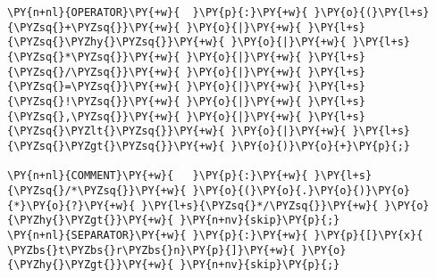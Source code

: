 \begin{Verbatim}[commandchars=\\\{\}]
\PY{n+nl}{OPERATOR}\PY{+w}{  }\PY{p}{:}\PY{+w}{ }\PY{o}{(}\PY{l+s}{\PYZsq{}+\PYZsq{}}\PY{+w}{ }\PY{o}{|}\PY{+w}{ }\PY{l+s}{\PYZsq{}\PYZhy{}\PYZsq{}}\PY{+w}{ }\PY{o}{|}\PY{+w}{ }\PY{l+s}{\PYZsq{}*\PYZsq{}}\PY{+w}{ }\PY{o}{|}\PY{+w}{ }\PY{l+s}{\PYZsq{}/\PYZsq{}}\PY{+w}{ }\PY{o}{|}\PY{+w}{ }\PY{l+s}{\PYZsq{}=\PYZsq{}}\PY{+w}{ }\PY{o}{|}\PY{+w}{ }\PY{l+s}{\PYZsq{}!\PYZsq{}}\PY{+w}{ }\PY{o}{|}\PY{+w}{ }\PY{l+s}{\PYZsq{},\PYZsq{}}\PY{+w}{ }\PY{o}{|}\PY{+w}{ }\PY{l+s}{\PYZsq{}\PYZlt{}\PYZsq{}}\PY{+w}{ }\PY{o}{|}\PY{+w}{ }\PY{l+s}{\PYZsq{}\PYZgt{}\PYZsq{}}\PY{+w}{ }\PY{o}{)}\PY{o}{+}\PY{p}{;}

\PY{n+nl}{COMMENT}\PY{+w}{   }\PY{p}{:}\PY{+w}{ }\PY{l+s}{\PYZsq{}/*\PYZsq{}}\PY{+w}{ }\PY{o}{(}\PY{o}{.}\PY{o}{)}\PY{o}{*}\PY{o}{?}\PY{+w}{ }\PY{l+s}{\PYZsq{}*/\PYZsq{}}\PY{+w}{ }\PY{o}{\PYZhy{}\PYZgt{}}\PY{+w}{ }\PY{n+nv}{skip}\PY{p}{;}
\PY{n+nl}{SEPARATOR}\PY{+w}{ }\PY{p}{:}\PY{+w}{ }\PY{p}{[}\PY{x}{ \PYZbs{}t\PYZbs{}r\PYZbs{}n}\PY{p}{]}\PY{+w}{ }\PY{o}{\PYZhy{}\PYZgt{}}\PY{+w}{ }\PY{n+nv}{skip}\PY{p}{;}
\end{Verbatim}
